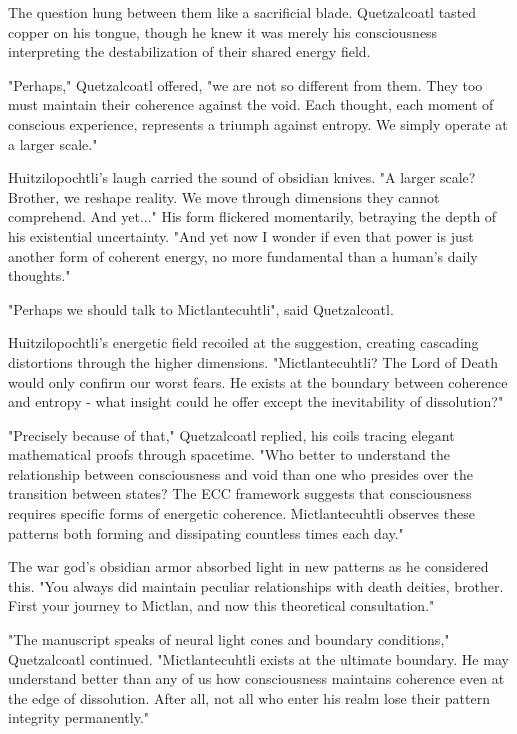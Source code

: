 The question hung between them like a sacrificial blade. Quetzalcoatl tasted copper on his tongue, though he knew it was merely his consciousness interpreting the destabilization of their shared energy field.

"Perhaps," Quetzalcoatl offered, "we are not so different from them. They too must maintain their coherence against the void. Each thought, each moment of~ conscious experience, represents a triumph against entropy. We simply operate at a larger scale."

Huitzilopochtli's laugh carried the sound of obsidian knives. "A larger scale? Brother, we reshape reality. We move through dimensions they cannot comprehend. And yet..." His form flickered momentarily, betraying the depth of his existential uncertainty. "And yet now I wonder if even that power is just another form of coherent energy, no more fundamental than a human's daily thoughts."

"Perhaps we should talk to Mictlantecuhtli", said Quetzalcoatl.

Huitzilopochtli's energetic field recoiled at the suggestion, creating cascading distortions through the higher dimensions. "Mictlantecuhtli? The Lord of Death would only confirm our worst fears. He exists at the boundary between coherence and entropy - what insight could he offer except the inevitability of dissolution?"

"Precisely because of that," Quetzalcoatl replied, his coils tracing elegant mathematical proofs through spacetime. "Who better to understand the relationship between consciousness and void than one who presides over the transition between states? The ECC framework suggests that consciousness requires specific forms of energetic coherence. Mictlantecuhtli observes these patterns both forming and dissipating countless times each day."

The war god's obsidian armor absorbed light in new patterns as he considered this. "You always did maintain peculiar relationships with death deities, brother. First your journey to Mictlan, and now this theoretical consultation."

"The manuscript speaks of neural light cones and boundary conditions," Quetzalcoatl continued. "Mictlantecuhtli exists at the ultimate boundary. He may understand better than any of us how consciousness maintains coherence even at the edge of dissolution. After all, not all who enter his realm lose their pattern integrity permanently."

